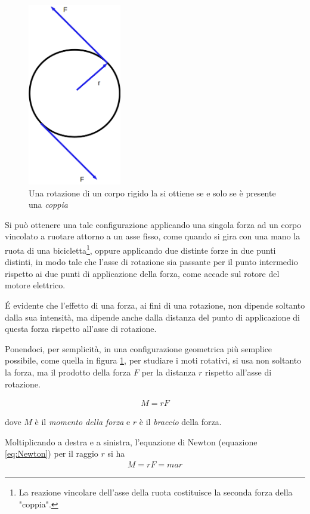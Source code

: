 \documentclass[17pt]{extarticle}
\begin{document}
\begin{figure}[ht!]		
	\centering
   	\includegraphics[width=1.6in]{Coppia.png}%
  	\caption{Una rotazione di un corpo rigido la si ottiene se e solo se è presente una \emph{coppia}}
   	\label{fig:Coppia}
\end{figure}

Si può ottenere una tale configurazione applicando una singola forza ad un corpo vincolato a ruotare attorno a un asse fisso, come quando si gira con una mano la ruota di una bicicletta\footnote{La reazione vincolare dell'asse della ruota costituisce la seconda forza della "coppia".}, oppure applicando due distinte forze in due punti distinti, in modo tale che l'asse di rotazione sia passante per il punto intermedio rispetto ai due punti di applicazione della forza, come accade sul rotore del motore elettrico.


\'E evidente che l'effetto di una forza, ai fini di una rotazione, non dipende soltanto dalla sua intensità, ma dipende anche dalla distanza del punto di applicazione di questa forza rispetto all'asse di rotazione. 

Ponendoci, per semplicità, in una configurazione geometrica più semplice possibile, come quella in figura \ref{fig:Coppia}, per studiare i moti rotativi, si usa non soltanto la forza, ma il prodotto della forza $F$ per la distanza $r$ rispetto all'asse di rotazione. 


\begin{eqnarray}
	M = rF
\end{eqnarray}

dove $M$ è il \emph{momento della forza} e $r$ è il \emph{braccio} della forza.



Moltiplicando a destra e a sinistra, l'equazione di Newton (equazione \ref{eq:Newton}) per il raggio $r$ si ha
\begin{eqnarray}\label{eq:Momento}
	M = rF = mar
\end{eqnarray}
\end{document}
